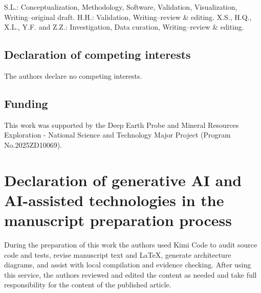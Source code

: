 \documentclass[preprint,12pt,numbers]{elsarticle}
\begin{document}
S.L.: Conceptualization, Methodology, Software, Validation, Visualization, Writing--original draft. H.H.: Validation, Writing--review \& editing. X.S., H.Q., X.L., Y.F. and Z.Z.: Investigation, Data curation, Writing--review \& editing.


\subsection*{Declaration of competing interests}

The authors declare no competing interests.

\subsection*{Funding}

This work was supported by the Deep Earth Probe and Mineral Resources Exploration - National Science and Technology Major Project (Program No.2025ZD10069).

\section*{Declaration of generative AI and AI-assisted technologies in the manuscript preparation process}

During the preparation of this work the authors used Kimi Code to audit source code and tests, revise manuscript text and LaTeX, generate architecture diagrams, and assist with local compilation and evidence checking. After using this service, the authors reviewed and edited the content as needed and take full responsibility for the content of the published article.
\end{document}
